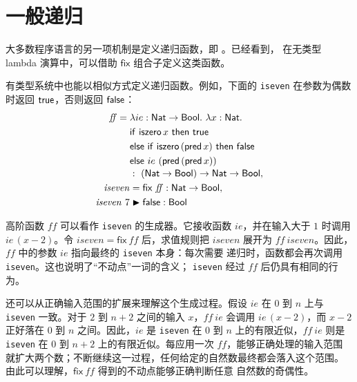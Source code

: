 \section{一般递归}
\label{sec:11.11}

大多数程序语言的另一项机制是定义递归函数，即
。已经看到，
在无类型 lambda 演算中，可以借助 \(\mathsf{fix}\) 组合子定义这类函数。

有类型系统中也能以相似方式定义递归函数。例如，下面的
\texttt{iseven} 在参数为偶数时返回 \(\mathsf{true}\)，否则返回
\(\mathsf{false}\)：
\[
\begin{aligned}
\mathit{ff}={}&\lambda ie:\mathsf{Nat}\to\mathsf{Bool}.\
\lambda x:\mathsf{Nat}.\\
&\mathsf{if}\ \mathsf{iszero}\,x\ \mathsf{then}\ \mathsf{true}\\
&\mathsf{else\ if}\ \mathsf{iszero}\,(\mathsf{pred}\,x)\
 \mathsf{then}\ \mathsf{false}\\
&\mathsf{else}\ ie\ (\mathsf{pred}\,(\mathsf{pred}\,x))
\\[-2pt]
&:\ (\mathsf{Nat}\to\mathsf{Bool})
   \to\mathsf{Nat}\to\mathsf{Bool},\\
\mathit{iseven}&=\mathsf{fix}\ \mathit{ff}
 :\mathsf{Nat}\to\mathsf{Bool},\\
\mathit{iseven}\ 7&\blacktriangleright
\mathsf{false}:\mathsf{Bool}
\end{aligned}
\]

高阶函数 \(\mathit{ff}\) 可以看作 \texttt{iseven} 的生成器。它接收函数
\(ie\)，并在输入大于 \(1\) 时调用 \(ie\,(x-2)\)。令
\(\mathit{iseven}=\mathsf{fix}\ \mathit{ff}\) 后，求值规则把
\(\mathit{iseven}\) 展开为 \(\mathit{ff}\ \mathit{iseven}\)。因此，
\(\mathit{ff}\) 中的参数 \(ie\) 指向最终的 \texttt{iseven} 本身：每次需要
递归时，函数都会再次调用 \texttt{iseven}。这也说明了“不动点”一词的含义；
\texttt{iseven} 经过 \(\mathit{ff}\) 后仍具有相同的行为。

还可以从正确输入范围的扩展来理解这个生成过程。假设 \(ie\) 在 \(0\) 到
\(n\) 上与 \texttt{iseven} 一致。对于 \(2\) 到 \(n+2\) 之间的输入
\(x\)，\(\mathit{ff}\ ie\) 会调用 \(ie\,(x-2)\)，而 \(x-2\) 正好落在
\(0\) 到 \(n\) 之间。因此，\(ie\) 是 \texttt{iseven} 在 \(0\) 到 \(n\)
上的有限近似，\(\mathit{ff}\ ie\) 则是 \texttt{iseven} 在 \(0\) 到
\(n+2\) 上的有限近似。每应用一次 \(\mathit{ff}\)，能够正确处理的输入范围
就扩大两个数；不断继续这一过程，任何给定的自然数最终都会落入这个范围。
由此可以理解，\(\mathsf{fix}\ \mathit{ff}\) 得到的不动点能够正确判断任意
自然数的奇偶性。

